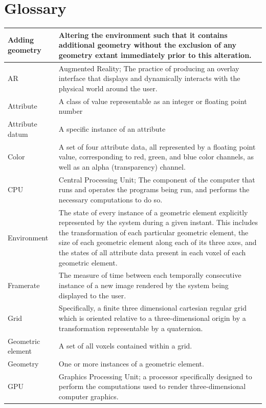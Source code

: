 \documentclass[onecolumn, draftclsnofoot,10pt, compsoc]{IEEEtran}
\begin{document}
\section{Glossary}
\begin{longtable}{ | l | p{12cm} | }
 \hline			
Adding geometry & Altering the environment such that it contains additional geometry without the exclusion of any geometry extant immediately prior to this alteration.  \\ \hline 
AR & Augmented Reality; The practice of producing an overlay interface that displays and dynamically interacts with the physical world around the user. \\ \hline 
Attribute & A class of value representable as an integer or floating point number  \\ \hline
Attribute datum & A specific instance of an attribute  \\ \hline
Color & A set of four attribute data, all represented by a floating point value, corresponding to red, green, and blue color channels, as well as an alpha (transparency) channel.  \\ \hline
CPU & Central Processing Unit; The component of the computer that runs and operates the programs being run, and performs the necessary computations to do so.  \\ \hline
Environment & The state of every instance of a geometric element explicitly represented by the system during a given instant. This includes the transformation of each particular geometric element, the size of each geometric element along each of its three axes, and the states of all attribute data present in each voxel of each geometric element. \\ \hline
Framerate & The measure of time between each temporally consecutive instance of a new image rendered by the system being displayed to the user. \\ \hline 
Grid &  Specifically, a finite three dimensional cartesian regular grid which is oriented relative to a three-dimensional origin by a transformation representable by a quaternion. \\ \hline
Geometric element & A set of all voxels contained within a grid.  \\ \hline
Geometry & One or more instances of a geometric element.  \\ \hline
GPU & Graphics Processing Unit; a processor specifically designed to perform the computations used to render three-dimensional computer graphics.  \\ \hline

\end{longtable}
\end{document}
